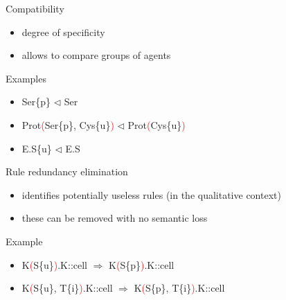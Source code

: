 \documentclass[10pt]{beamer}
\begin{document}

\begin{frame}[fragile]{Compatibility}

\begin{itemize}
	\item degree of specificity
	\item allows to compare groups of agents
\end{itemize}

Examples

\begin{itemize}
\item Ser\{\textcolor{mygreen}{p}\} $\lhd$ Ser
\item Prot\textcolor{red}{(}Ser\{\textcolor{mygreen}{p}\}, Cys\{\textcolor{mygreen}{u}\}\textcolor{red}{)} $\lhd$ Prot\textcolor{red}{(}Cys\{\textcolor{mygreen}{u}\}\textcolor{red}{)} 
\item E.S\{\textcolor{mygreen}{u}\} $\lhd$ E.S
\end{itemize}

\end{frame}


\begin{frame}[fragile]{Rule redundancy elimination}

\begin{itemize}
	\item identifies potentially useless rules (in the qualitative context)
	\item these can be removed with no semantic loss
\end{itemize}

Example

\begin{itemize}
  \item[\ding{51}] K\textcolor{red}{(}S\{\textcolor{mygreen}{u}\}\textcolor{red}{)}.K::cell $\Rightarrow$ K\textcolor{red}{(}S\{\textcolor{mygreen}{p}\}\textcolor{red}{)}.K::cell
  \item[\ding{55}] K\textcolor{red}{(}S\{\textcolor{mygreen}{u}\}, T\{\textcolor{mygreen}{i}\}\textcolor{red}{)}.K::cell $\Rightarrow$ K\textcolor{red}{(}S\{\textcolor{mygreen}{p}\}, T\{\textcolor{mygreen}{i}\}\textcolor{red}{)}.K::cell
\end{itemize}

\end{frame}

\end{document}
